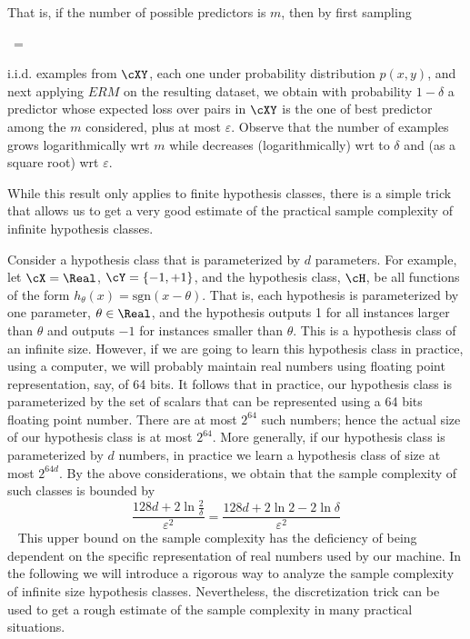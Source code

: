 That is, if the number of possible predictors is $m$, then by first sampling
\begin{myequation}
\left\lceil{}\ln\frac{2\lvert\cH\rvert}{\delta}  \right\rceil=\left\lceil{}  \right\rceil
\end{myequation}
i.i.d. examples from $\cXY$, each one under probability distribution $p(x,y)$, and next applying $ERM$ on the resulting dataset, we obtain with probability $1-\delta$ a predictor whose expected loss over pairs in $\cXY$ is the one of best predictor among the $m$ considered, plus at most $\varepsilon$.
Observe that the number of examples grows logarithmically wrt $m$ while decreases (logarithmically) wrt to $\delta$ and (as a square root) wrt $\varepsilon$.

While this result only
applies to finite hypothesis classes, there is a simple trick that allows us to get a
very good estimate of the practical sample complexity of infinite hypothesis classes.

Consider a hypothesis class that is parameterized by $d$ parameters. For example,
let $\cX=\Real$, $\cY=\{-1,+1\}$, and the hypothesis class, $\cH$, be all functions of the form
$h_\theta(x)=\text{sgn}(x-\theta)$. That is, each hypothesis is parameterized by one parameter,
$\theta\in\Real$, and the hypothesis outputs 1 for all instances larger than $\theta$ and outputs $-1$
for instances smaller than $\theta$. This is a hypothesis class of an infinite size. However,
if we are going to learn this hypothesis class in practice, using a computer, we will
probably maintain real numbers using floating point representation, say, of 64 bits.
It follows that in practice, our hypothesis class is parameterized by the set of scalars
that can be represented using a 64 bits floating point number. There are at most $2^{64}$
such numbers; hence the actual size of our hypothesis class is at most $2^{64}$. More generally, if our hypothesis class is parameterized by $d$ numbers, in practice we learn
a hypothesis class of size at most $2^{64d}$. By the above considerations, we obtain that the
sample complexity of such classes is bounded by 
\[
\frac{128d+2\ln\frac{2}{\delta}}{\varepsilon^2}=\frac{128d+2\ln 2-2\ln\delta}{\varepsilon^2}
\] 
This upper bound on the sample complexity has the deficiency of being dependent on the specific representation of real numbers used by our machine. In the following we will introduce a rigorous way to analyze the sample complexity of infinite size hypothesis classes. Nevertheless, the discretization trick can be used to get a rough estimate of the sample complexity in many practical situations.



